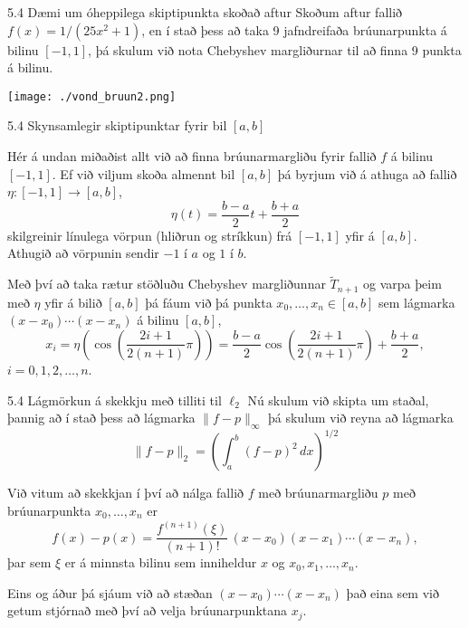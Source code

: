 \begin{frame}{5.4 Dæmi um óheppilega skiptipunkta skoðað aftur}
Skoðum aftur fallið 
$f(x) = 1/(25x^2+1)$, en í stað þess að taka 9  jafndreifaða brúunarpunkta
á bilinu $[-1,1]$, þá skulum við nota Chebyshev margliðurnar til að finna 9
punkta á bilinu.

\begin{center}
 \texttt{[image: ./vond\_bruun2.png]}
\end{center}

\end{frame}

\begin{frame}{5.4 Skynsamlegir skiptipunktar fyrir bil $[a,b]$}
 \begin{block}{}
  Hér á undan miðaðist allt við að finna brúunarmargliðu fyrir fallið $f$ á bilinu
  $[-1,1]$. \pause
  Ef við viljum skoða almennt bil $[a,b]$ þá byrjum við á athuga að fallið 
  $\eta:[-1,1]\to [a,b]$, 
  $$
    \eta(t) = \frac{b-a}2 t + \frac{b+a}2
  $$
  skilgreinir línulega vörpun (hliðrun og stríkkun) frá $[-1,1]$ yfir á 
  $[a,b]$. \pause
  Athugið að vörpunin sendir $-1$ í $a$ og $1$ í $b$.
  \pause
  
  Með því að taka rætur stöðluðu Chebyshev margliðunnar $\tilde T_{n+1}$ 
  og varpa þeim með $\eta$ yfir á bilið $[a,b]$ þá fáum við þá punkta
  $x_0,\ldots,x_n \in [a,b]$ sem lágmarka 
  $(x-x_0)\cdots (x-x_n)$ á bilinu $[a,b]$,\pause
  $$
    x_i = \eta\left(\cos\left(\frac{2i+1}{2(n+1)}\pi\right)\right) 
    = \frac{b-a}2 \cos\left(\frac{2i+1}{2(n+1)}\pi\right) + \frac{b+a}2,
  $$
  $i=0,1,2,\ldots,n$.
 \end{block}

\end{frame}


\begin{frame}{5.4 Lágmörkun á skekkju með tilliti til $\ell_2$}
 Nú skulum við skipta um staðal, þannig að í stað þess að lágmarka
 $\|f-p\|_\infty$ þá skulum við reyna að lágmarka
 $$
  \|f-p\|_2 = \left(\int_a^b (f-p)^2\, dx\right)^{1/2}
 $$
\pause 

  Við vitum að skekkjan í því að nálga fallið $f$ með brúunarmargliðu $p$
  með brúunarpunkta $x_0,\ldots,x_n$ er
  $$
    f(x)-p(x) = \frac{f^{(n+1)}(\xi)}{(n+1)!}\, (x-x_0)(x-x_1)\cdots (x-x_n),
  $$
  þar sem $\xi$ er á minnsta bilinu sem inniheldur $x$ og $x_0,x_1,\ldots,x_n$. \pause
  
  Eins og áður þá sjáum við að stæðan $(x-x_0)\cdots(x-x_n)$ það eina sem við getum stjórnað
  með því að velja brúunarpunktana $x_j$.

 \end{frame}

